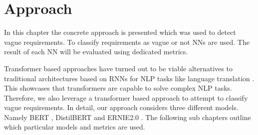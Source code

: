 \chapter{Approach}
\label{chp:approach}


In this chapter the concrete approach is presented which was used to detect vague requirements.
To classify requirements as vague or not \acp{NN} are used.
The result of each \ac{NN} will be evaluated using dedicated metrics.

Transformer based approaches have turned out to be viable alternatives to traditional architectures based on \acp{RNN} for \ac{NLP} tasks like language translation \parencites{Gehring:2017}{Vaswani:2017}.
This showcases that transformers are capable to solve complex \ac{NLP} tasks.
Therefore, we also leverage a transformer based approach to attempt to classify vague requirements.
In detail, our approach considers three different models.
Namely \ac{BERT} \parencite{Devlin:2018}, \ac{DistilBERT} \parencite{Sanh:2019} and \ac{ERNIE2.0} \parencite{Sun:2019a}.
The following sub chapters outline which particular models and metrics are used.




